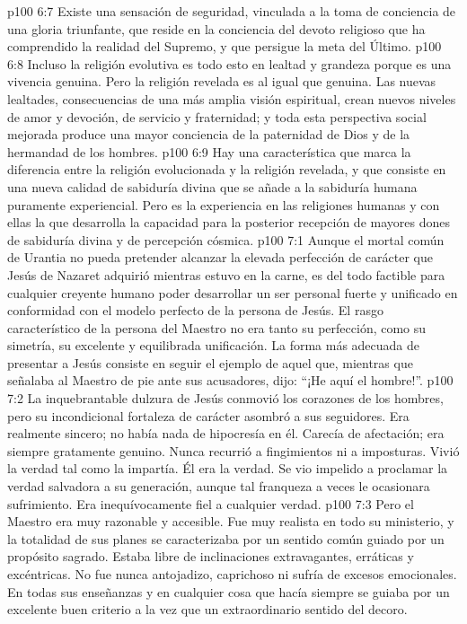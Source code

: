 \vs p100 6:7 Existe una sensación de seguridad, vinculada a la toma de conciencia de una gloria triunfante, que reside en la conciencia del devoto religioso que ha comprendido la realidad del Supremo, y que persigue la meta del Último.
\vs p100 6:8 \pc Incluso la religión evolutiva es todo esto en lealtad y grandeza porque es una vivencia genuina. Pero la religión revelada es  al igual que genuina. Las nuevas lealtades, consecuencias de una más amplia visión espiritual, crean nuevos niveles de amor y devoción, de servicio y fraternidad; y toda esta perspectiva social mejorada produce una mayor conciencia de la paternidad de Dios y de la hermandad de los hombres.
\vs p100 6:9 Hay una característica que marca la diferencia entre la religión evolucionada y la religión revelada, y que consiste en una nueva calidad de sabiduría divina que se añade a la sabiduría humana puramente experiencial. Pero es la experiencia en las religiones humanas y con ellas la que desarrolla la capacidad para la posterior recepción de mayores dones de sabiduría divina y de percepción cósmica.
\vs p100 7:1 Aunque el mortal común de Urantia no pueda pretender alcanzar la elevada perfección de carácter que Jesús de Nazaret adquirió mientras estuvo en la carne, es del todo factible para cualquier creyente humano poder desarrollar un ser personal fuerte y unificado en conformidad con el modelo perfecto de la persona de Jesús. El rasgo característico de la persona del Maestro no era tanto su perfección, como su simetría, su excelente y equilibrada unificación. La forma más adecuada de presentar a Jesús consiste en seguir el ejemplo de aquel que, mientras que señalaba al Maestro de pie ante sus acusadores, dijo: “¡He aquí el hombre!”.
\vs p100 7:2 La inquebrantable dulzura de Jesús conmovió los corazones de los hombres, pero su incondicional fortaleza de carácter asombró a sus seguidores. Era realmente sincero; no había nada de hipocresía en él. Carecía de afectación; era siempre gratamente genuino. Nunca recurrió a fingimientos ni a imposturas. Vivió la verdad tal como la impartía. Él era la verdad. Se vio impelido a proclamar la verdad salvadora a su generación, aunque tal franqueza a veces le ocasionara sufrimiento. Era inequívocamente fiel a cualquier verdad.
\vs p100 7:3 Pero el Maestro era muy razonable y accesible. Fue muy realista en todo su ministerio, y la totalidad de sus planes se caracterizaba por un sentido común guiado por un propósito sagrado. Estaba libre de inclinaciones extravagantes, erráticas y excéntricas. No fue nunca antojadizo, caprichoso ni sufría de excesos emocionales. En todas sus enseñanzas y en cualquier cosa que hacía siempre se guiaba por un excelente buen criterio a la vez que un extraordinario sentido del decoro.
